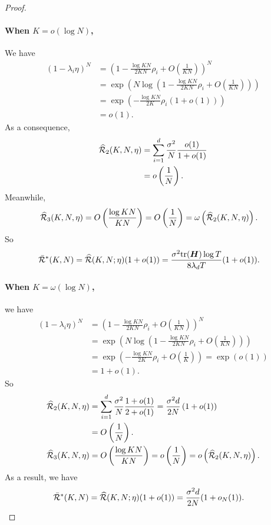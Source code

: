 \begin{proof}
\paragraph{When $K = o(\log N)$,} We have  
\begin{align*}
    (1-\lambda_i\eta)^N &= \left(1-\frac{\log KN}{2KN}\rho_i+O\left(\frac{1}{KN}\right)\right)^N \\
    &=\exp\left(N\log\left(1-\frac{\log KN}{2KN}\rho_i+O\left(\frac{1}{KN}\right)\right)\right) \\
    &=\exp\left(-\frac{\log KN}{2K}\rho_i(1+o(1))\right) \\
    &=o(1).
\end{align*}
As a consequence, 
\begin{align*}
    \widehat{\mathcal{R}}_2(K,N, \eta)&=\sum_{i=1}^d\frac{\sigma^2}{N}\frac{o(1)}{1+o(1)} \\
    &=o\left(\frac{1}{N}\right).
\end{align*}
Meanwhile,
\begin{align*}
    \widehat{\mathcal{R}}_3(K,N, \eta)&=O\left(\frac{\log KN}{KN}\right) = O\left(\frac{1}{N}\right) = \omega\left(\widehat{\mathcal{R}}_2(K,N, \eta)\right).
\end{align*}
So 
\begin{align*}
    \bar{\mathcal{R}}^*(K, N)=\widehat{\mathcal{R}}(K,N; \eta)(1+o(1))&=\frac{\sigma^2\mathrm{tr}({\bm{H}})\log T}{8\lambda_d T}(1+o(1)).
\end{align*}
\paragraph{When $K = \omega\left(\log N\right)$,} we have
\begin{align*}
    (1-\lambda_i\eta)^N &= \left(1-\frac{\log KN}{2KN}\rho_i+O\left(\frac{1}{KN}\right)\right)^N \\
    &=\exp\left(N\log\left(1-\frac{\log KN}{2KN}\rho_i+O\left(\frac{1}{KN}\right)\right)\right) \\
    &=\exp\left(-\frac{\log KN}{2K}\rho_i+O\left(\frac{1}{K}\right)\right)=\exp\left(o(1)\right) \\
    &=1+o(1).
\end{align*}
So
\begin{align*}
    \widehat{\mathcal{R}}_2(K,N, \eta)&=\sum_{i=1}^d\frac{\sigma^2}{N}\frac{1+o(1)}{2+o(1)} = \frac{\sigma^2d}{2N}\left(1+o(1)\right) \\
    &=O\left(\frac{1}{N}\right). \\
    \widehat{\mathcal{R}}_3(K,N, \eta)&=O\left(\frac{\log KN}{KN}\right) = o\left(\frac{1}{N}\right)=o\left(\widehat{\mathcal{R}}_2(K,N, \eta)\right).
\end{align*}
As a result, we have
\begin{align*}
    \Bar{\mathcal{R}}^*(K, N)=\widehat{\mathcal{R}}(K,N; \eta)(1+o(1))&=\frac{\sigma^2d}{2N}(1+o_N(1)).
\end{align*}


\end{proof}
